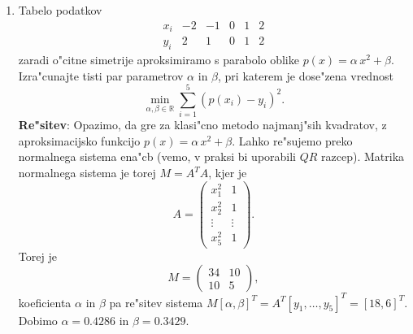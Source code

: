 \documentclass[12pt,a4paper]{article}
\def\RR{\mathbb{R}}
\begin{document}
\begin{enumerate}
  \item Tabelo podatkov
   $$\begin{array}{c|rrrrr}
     x_i & -2 & -1 & 0 & 1 & 2\\ \hline
     y_i &  2 &  1 & 0 & 1 & 2
     \end{array}
   $$
   zaradi o"citne simetrije aproksimiramo s parabolo oblike
    $p(x)=\alpha\,x^2+\beta$. 
    Izra"cunajte tisti par parametrov $\alpha$ in
    $\beta$, pri katerem je dose"zena vrednost
    $$\min_{\alpha,\beta\in\RR}\sum_{i=1}^5(p(x_i)-y_i)^2.$$
    {\bf Re"sitev}: Opazimo, da gre za klasi"cno metodo najmanj"sih 
    kvadratov, z aproksimacijsko funkcijo $p(x)=\alpha\,x^2+\beta$.
    Lahko re"sujemo preko normalnega sistema ena"cb (vemo, v praksi bi
    uporabili $QR$ razcep). Matrika normalnega sistema je torej
    $M=A^TA$, kjer je 
    $$A=\left(
             \begin{array}{cc}
               x_1^2 & 1\\
               x_2^2 & 1 \\
               \vdots & \vdots \\
               x_5^2 & 1
             \end{array}
      \right).
      $$
      Torej je 
      $$M=\left(
                   \begin{array}{cc}
                     34 & 10\\
                     10 & 5
                   \end{array}
      \right),
      $$
      koeficienta $\alpha$ in $\beta$ pa re"sitev sistema
      $M[\alpha,\beta]^T=A^T[y_1,\dots,y_5]^T=[18,6]^T$.
      Dobimo $\alpha=0.4286$ in $\beta=0.3429$.
      

\end{enumerate}
\end{document}
